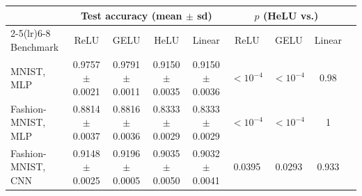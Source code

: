 \begin{tabular}{lcccccccc}
\toprule
 & \multicolumn{4}{c}{Test accuracy (mean $\pm$ sd)} & \multicolumn{3}{c}{$p$ (HeLU vs.)} \\
\cmidrule(lr){2-5}\cmidrule(lr){6-8}
Benchmark & ReLU & GELU & HeLU & Linear & ReLU & GELU & Linear \\
\midrule
MNIST, MLP & 0.9757 $\pm$ 0.0021 & 0.9791 $\pm$ 0.0011 & 0.9150 $\pm$ 0.0035 & 0.9150 $\pm$ 0.0036 & $<10^{-4}$ & $<10^{-4}$ & 0.98 \\
Fashion-MNIST, MLP & 0.8814 $\pm$ 0.0037 & 0.8816 $\pm$ 0.0036 & 0.8333 $\pm$ 0.0029 & 0.8333 $\pm$ 0.0029 & $<10^{-4}$ & $<10^{-4}$ & 1 \\
Fashion-MNIST, CNN & 0.9148 $\pm$ 0.0025 & 0.9196 $\pm$ 0.0005 & 0.9035 $\pm$ 0.0050 & 0.9032 $\pm$ 0.0041 & 0.0395 & 0.0293 & 0.933 \\
\bottomrule
\end{tabular}
